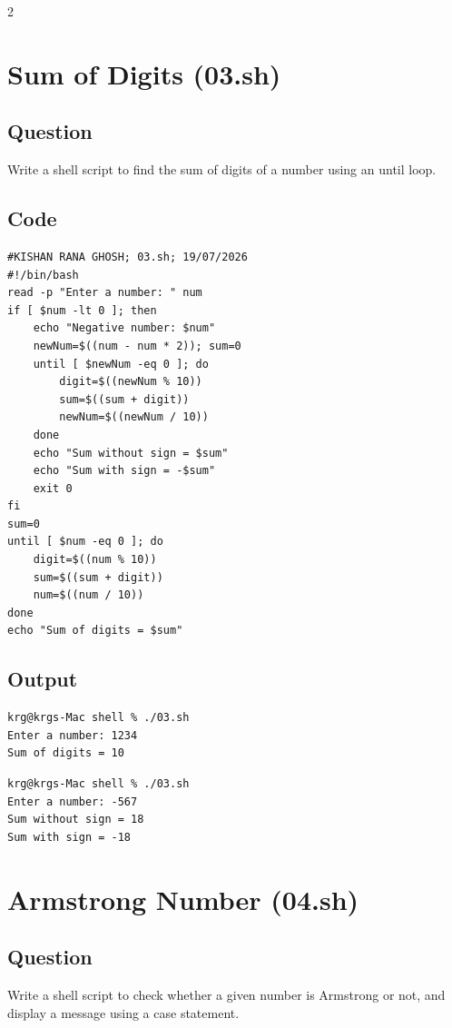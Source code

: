 \documentclass[a4paper,12pt]{article}
\begin{document}
\begin{multicols}{2}

\section{Sum of Digits (03.sh)}
\subsection*{Question}
Write a shell script to find the sum of digits of a number using an until loop.

\subsection*{Code}
\begin{lstlisting}[style=bashstyle]
#KISHAN RANA GHOSH; 03.sh; 19/07/2026
#!/bin/bash
read -p "Enter a number: " num
if [ $num -lt 0 ]; then
    echo "Negative number: $num"
    newNum=$((num - num * 2)); sum=0
    until [ $newNum -eq 0 ]; do
        digit=$((newNum % 10))
        sum=$((sum + digit))
        newNum=$((newNum / 10))
    done
    echo "Sum without sign = $sum"
    echo "Sum with sign = -$sum"
    exit 0
fi
sum=0
until [ $num -eq 0 ]; do
    digit=$((num % 10))
    sum=$((sum + digit))
    num=$((num / 10))
done
echo "Sum of digits = $sum"
\end{lstlisting}

\subsection*{Output}
\begin{lstlisting}[style=outputstyle]
krg@krgs-Mac shell % ./03.sh
Enter a number: 1234
Sum of digits = 10
\end{lstlisting}
\begin{lstlisting}[style=outputstyle]
krg@krgs-Mac shell % ./03.sh
Enter a number: -567
Sum without sign = 18
Sum with sign = -18
\end{lstlisting}

\columnbreak

\section{Armstrong Number (04.sh)}
\subsection*{Question}
Write a shell script to check whether a given number is Armstrong or not, and display a message using a case statement.


\end{multicols}
\end{document}
